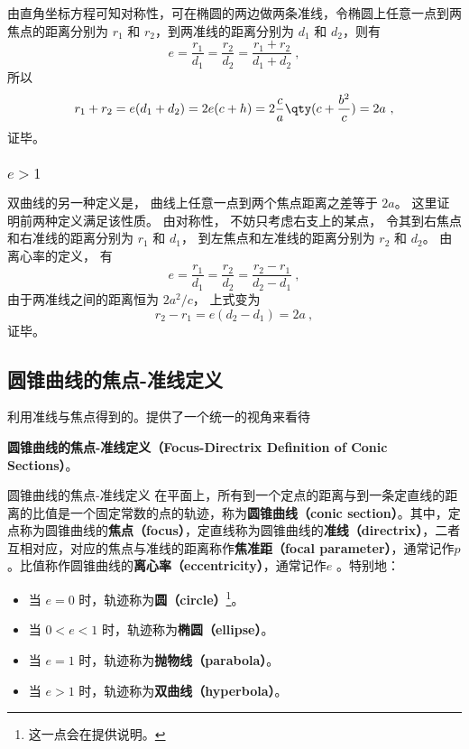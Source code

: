 由直角坐标方程可知对称性，可在椭圆的两边做两条准线，令椭圆上任意一点到两焦点的距离分别为 $r_1$ 和 $r_2$，到两准线的距离分别为 $d_1$ 和 $d_2$，则有
\begin{equation}
e = \frac{r_1}{d_1} = \frac{r_2}{d_2} = \frac{r_1 + r_2}{d_1 + d_2}~,
\end{equation}
所以
\begin{equation}
r_1 + r_2 = e(d_1+d_2) = 2e(c + h) = 2\frac{c}{a} \qty( c + \frac{b^2}{c} ) = 2a~,
\end{equation}
证毕。
\subsubsection{$e>1$}
双曲线的另一种定义是， 曲线上任意一点到两个焦点距离之差等于 $2a$。 这里证明前两种定义满足该性质。 由对称性， 不妨只考虑右支上的某点， 令其到右焦点和右准线的距离分别为 $r_1$ 和 $d_1$， 到左焦点和左准线的距离分别为 $r_2$ 和 $d_2$。 由离心率的定义， 有
\begin{equation}
e = \frac{r_1}{d_1} = \frac{r_2}{d_2} = \frac{r_2 - r_1}{d_2 - d_1}~,
\end{equation}
由于两准线之间的距离恒为 $2a^2/c$， 上式变为
\begin{equation}
r_2 - r_1 = e(d_2 - d_1) = 2a~,
\end{equation}
证毕。

\subsection{圆锥曲线的焦点-准线定义}



利用准线与焦点得到的。提供了一个统一的视角来看待



\textbf{圆锥曲线的焦点-准线定义（Focus-Directrix Definition of Conic Sections）}。

\begin{definition}{圆锥曲线的焦点-准线定义}\label{def_HsCsFD_1}
在平面上，所有到一个定点的距离与到一条定直线的距离的比值是一个固定常数的点的轨迹，称为\textbf{圆锥曲线（conic section）}。其中，定点称为圆锥曲线的\textbf{焦点（focus）}，定直线称为圆锥曲线的\textbf{准线（directrix）}，二者互相对应，对应的焦点与准线的距离称作\textbf{焦准距（focal parameter）}，通常记作$p$。比值称作圆锥曲线的\textbf{离心率（eccentricity）}，通常记作$e$ 。特别地：
\begin{itemize}
\item 当 $e = 0$ 时，轨迹称为\textbf{圆（circle）}\footnote{这一点会在提供说明。}。
\item 当 $0 < e < 1$ 时，轨迹称为\textbf{椭圆（ellipse）}。
\item 当 $e = 1$ 时，轨迹称为\textbf{抛物线（parabola）}。
\item 当 $e > 1$ 时，轨迹称为\textbf{双曲线（hyperbola）}。
\end{itemize}
\end{definition}


